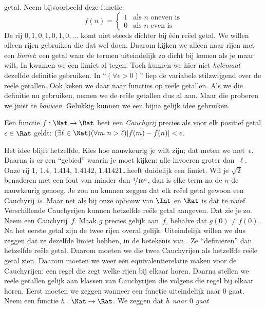 \documentclass[../../../include/open-logic-section]{subfiles}
\begin{document}
getal. Neem bijvoorbeeld deze functie:
\[
	f(n) =\begin{cases}
			1 & \text{als }n\text{ oneven is}\\
			0 &\text{als }n\text{ even is}
		\end{cases}
\]
De rij $0,1,0,1,0,1,0,\ldots$ komt niet steeds dichter bij één reëel
getal. We willen alleen rijen gebruiken die dat wel doen. Daarom kijken
we alleen naar rijen met een \emph{limiet}: een getal waar de termen
uiteindelijk zo dicht bij komen als je maar wilt.
In  kwamen we een limiet al tegen. Toch
kunnen we hier niet \emph{helemaal} dezelfde definitie gebruiken. In
``$(\forall \epsilon>0)$'' liep de variabele stilzwijgend over de reële
getallen. Ook keken we daar naar functies op reële getallen. Als we die
definitie nu gebruiken, nemen we de reële getallen dus al aan. Maar die
proberen we juist te \emph{bouwen}. Gelukkig kunnen we een bijna gelijk
idee gebruiken.
\begin{defn}
  Een functie $f: \Nat \to \Rat$ heet een \emph{Cauchyrij} precies als
  voor elk positief getal $\epsilon \in \Rat$ geldt: $(\exists \ell
  \in \Nat)(\forall m, n > \ell)|f(m) - f(n)| < \epsilon$.
\end{defn}
Het idee blijft hetzelfde. Kies hoe nauwkeurig je wilt zijn; dat meten
we met~$\epsilon$. Daarna is er een ``gebied'' waarin je moet kijken:
alle invoeren groter dan~$\ell$. Onze rij $1$, $1.4$, $1.414$,
$1.4142$, $1.41421$\ldots heeft duidelijk een limiet. Wil je
$\sqrt{2}$ benaderen met een fout van minder dan
$\nicefrac{1}{10^{n}}$, dan is elke term na de $n$-de nauwkeurig genoeg.
Je zou nu kunnen zeggen dat elk reëel getal gewoon een Cauchyrij
\emph{is}. Maar net als bij onze opbouw van $\Int$ en $\Rat$ is dat te
na\"ief. Verschillende Cauchyrijen kunnen hetzelfde reële getal
aangeven. Dat zie je zo. Neem een Cauchyrij~$f$. Maak $g$ precies gelijk
aan~$f$, behalve dat $g(0)\neq f(0)$. Na het eerste getal zijn de twee
rijen overal gelijk. Uiteindelijk willen we dus zeggen dat ze dezelfde
limiet hebben, in de betekenis van . Ze
``definiëren'' dan hetzelfde reële getal. Daarom moeten we die twee
Cauchyrijen als hetzelfde reële getal zien.
Daarom moeten we weer een equivalentierelatie maken voor de
Cauchyrijen: een regel die zegt welke rijen bij elkaar horen. Daarna
stellen we reële getallen gelijk aan klassen van Cauchyrijen die volgens
die regel bij elkaar horen. Eerst moeten
we zeggen wanneer een functie uiteindelijk naar $0$ gaat. Neem een
functie $h : \Nat \to \Rat$. We zeggen dat \emph{$h$ naar $0$ gaat}
\end{document}
